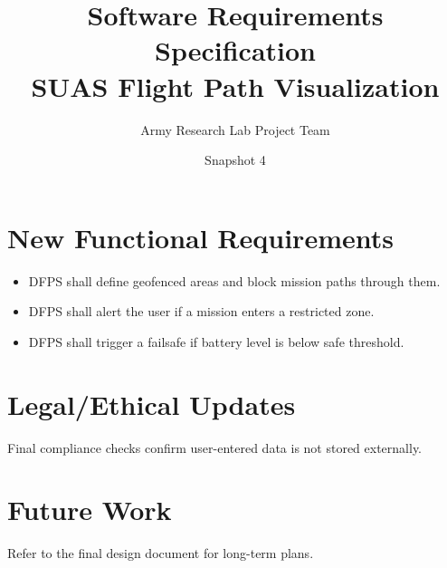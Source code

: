 \documentclass[12pt]{article}
\title{Software Requirements Specification\\SUAS Flight Path Visualization}
\author{Army Research Lab Project Team}
\date{Snapshot 4}
\begin{document}
\maketitle

\tableofcontents
\newpage

\section{New Functional Requirements}
\begin{itemize}
  \item DFPS shall define geofenced areas and block mission paths through them.
  \item DFPS shall alert the user if a mission enters a restricted zone.
  \item DFPS shall trigger a failsafe if battery level is below safe threshold.
\end{itemize}

\section{Legal/Ethical Updates}
Final compliance checks confirm user-entered data is not stored externally.

\section{Future Work}
Refer to the final design document for long-term plans.
\end{document}

